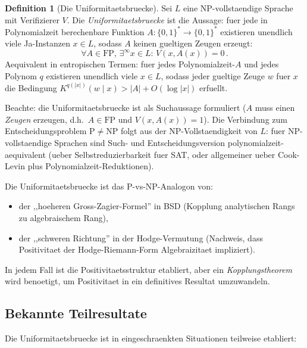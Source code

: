 \documentclass[aps,prd,twocolumn,superscriptaddress,nofootinbib]{revtex4-2}
\theoremstyle{definition}
\newtheorem{definition}[theorem]{Definition}
\theoremstyle{remark}
\newcommand{\NP}{\mathrm{NP}}
\newcommand{\PP}{\mathrm{P}}
\begin{document}
\begin{definition}[Die Uniformitaetsbruecke]
\label{def:uniformity}
Sei $L$ eine NP-vollstaendige Sprache mit Verifizierer $V$. Die \textit{Uniformitaetsbruecke} ist die Aussage: fuer jede in Polynomialzeit berechenbare Funktion $A: \{0,1\}^* \to \{0,1\}^*$ existieren unendlich viele Ja-Instanzen $x \in L$, sodass $A$ keinen gueltigen Zeugen erzeugt:
\begin{equation}
\forall A \in \mathrm{FP},\, \exists^\infty x \in L:\, V(x, A(x)) = 0\,.
\end{equation}
Aequivalent in entropischen Termen: fuer jedes Polynomialzeit-$A$ und jedes Polynom $q$ existieren unendlich viele $x \in L$, sodass jeder gueltige Zeuge $w$ fuer $x$ die Bedingung $K^{q(|x|)}(w \mid x) > |A| + O(\log|x|)$ erfuellt.

Beachte: die Uniformitaetsbruecke ist als Suchaussage formuliert ($A$ muss einen \textit{Zeugen} erzeugen, d.h.\ $A \in \mathrm{FP}$ und $V(x, A(x)) = 1$). Die Verbindung zum Entscheidungsproblem $\PP \neq \NP$ folgt aus der NP-Vollstaendigkeit von $L$: fuer NP-vollstaendige Sprachen sind Such- und Entscheidungsversion polynomialzeit-aequivalent (ueber Selbstreduzierbarkeit fuer SAT, oder allgemeiner ueber Cook-Levin plus Polynomialzeit-Reduktionen).
\end{definition}

Die Uniformitaetsbruecke ist das P-vs-NP-Analogon von:
\begin{itemize}
\item der ,,hoeheren Gross-Zagier-Formel'' in BSD (Kopplung analytischen Rangs zu algebraischem Rang),
\item der ,,schweren Richtung'' in der Hodge-Vermutung (Nachweis, dass Positivitaet der Hodge-Riemann-Form Algebraizitaet impliziert).
\end{itemize}

In jedem Fall ist die Positivitaetsstruktur etabliert, aber ein \textit{Kopplungstheorem} wird benoetigt, um Positivitaet in ein definitives Resultat umzuwandeln.

\subsection{Bekannte Teilresultate}

Die Uniformitaetsbruecke ist in eingeschraenkten Situationen teilweise etabliert:
\end{document}
